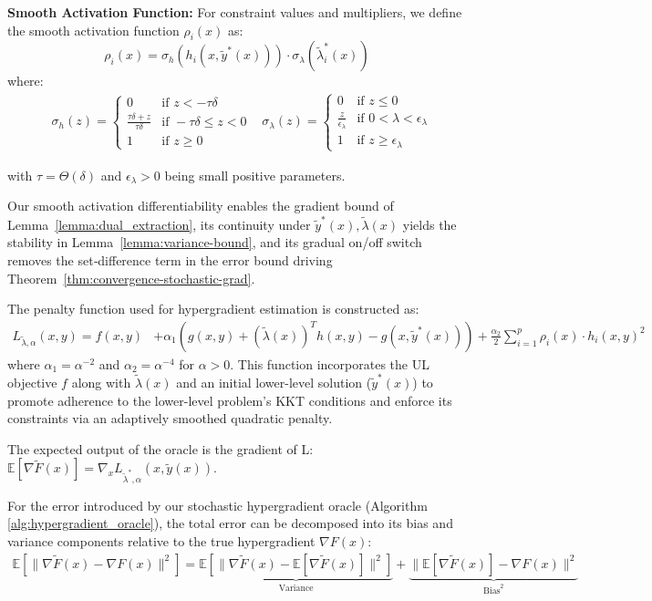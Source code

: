 \documentclass[letterpaper]{article} %
\newcommand{\1}{\mathbf{1}}
\begin{document}
\textbf{Smooth Activation Function:}
For constraint values and multipliers, we define the smooth activation function $\rho_i(x)$ as:
$$\rho_i(x) = \sigma_h(h_i(x, \tilde{y}^*(x))) \cdot \sigma_\lambda(\tilde{\lambda}^*_i(x))$$
where:
\begin{align}
    & \sigma_h(z) = \begin{cases}
0 & \text{if } z < -\tau \delta \\
\frac{\tau \delta + z}{\tau \delta} & \text{if } -\tau \delta \leq z < 0 \\
1 & \text{if } z \geq 0
\end{cases}
& \sigma_\lambda(z) = \begin{cases}
0 & \text{if } z \leq 0 \\
\frac{z}{\epsilon_\lambda} & \text{if } 0 < \lambda < \epsilon_\lambda \\
1 & \text{if } z \geq \epsilon_\lambda
\end{cases}
\end{align}

with $\tau = \Theta(\delta)$ and $\epsilon_\lambda > 0$ being small positive parameters.

Our smooth activation differentiability enables the gradient bound of Lemma~\ref{lemma:dual_extraction}, its continuity under $\tilde{y}^*(x),\tilde{\lambda}(x)$ yields the stability in Lemma~\ref{lemma:variance-bound}, and its gradual on/off switch removes the set‑difference term in the error bound driving Theorem~\ref{thm:convergence-stochastic-grad}.

The penalty function used for hypergradient estimation is constructed as:
\begin{align}
L_{\tilde{\lambda},\alpha}(x,y) = f(x, y) &+ \alpha_1 \left( g(x, y) + (\tilde{\lambda}(x))^T h(x, y) - g(x, \tilde{y}^*(x)) \right) \nonumber + \frac{\alpha_2}{2} \sum_{i=1}^{p} \rho_i(x) \cdot h_i(x, y)^2 \label{eq:penalty_hg}
\end{align}
where $\alpha_1 = \alpha^{-2}$ and $\alpha_2 = \alpha^{-4}$ for $\alpha > 0$. This function incorporates the UL objective $f$ along with $\tilde{\lambda}(x)$ and an initial lower-level solution ($\tilde{y}^*(x)$) to promote adherence to the lower-level problem's KKT conditions and enforce its constraints via an adaptively smoothed quadratic penalty.

The expected output of the oracle is the gradient of L: $\mathbb{E}[\nabla\tilde{F}(x)] = \nabla_x L_{\tilde{\lambda}^*,\alpha}(x, \tilde{y}(x))$.


For the error introduced by our stochastic hypergradient oracle (Algorithm \ref{alg:hypergradient_oracle}), the total error can be decomposed into its bias and variance components relative to the true hypergradient $\nabla F(x)$:
\begin{align}
\mathbb{E}[\|\nabla\tilde{F}(x) - \nabla F(x)\|^2] = \underbrace{\mathbb{E}[\|\nabla\tilde{F}(x) - \mathbb{E}[\nabla\tilde{F}(x)]\|^2]}_{\text{Variance}} + \underbrace{\|\mathbb{E}[\nabla\tilde{F}(x)] - \nabla F(x)\|^2}_{\text{Bias}^2}
\end{align}
\end{document}
